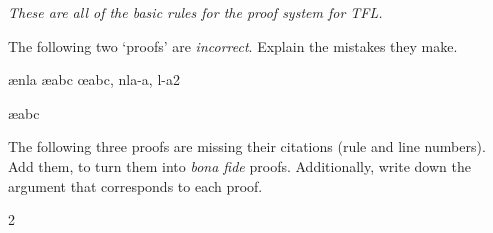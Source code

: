 \emph{These are all of the basic rules for the proof system for TFL.}

\practiceproblems

\problempart
The following two `proofs' are \emph{incorrect}. Explain the mistakes they make.
\begin{fitchproof}
\PR
\open
{}\AS
{}\ae{nla}
	\ae{abc}
\close
\open
	\AS
\close
{}\oe{abc, nla-a, l-a2}
\end{fitchproof}

\begin{fitchproof}
\PR
{}\PR
{}\ae{abc}
\end{fitchproof}

\problempart
The following three proofs are missing their citations (rule and line numbers). Add them, to turn them into \emph{bona fide} proofs. Additionally, write down the argument that corresponds to each proof.
\begin{multicols}{2}
\begin{fitchproof}
\end{fitchproof}

\begin{fitchproof}
\open
\close
{}%
\end{fitchproof}

\begin{fitchproof}
\open
\close
\open
\close
{}%
\end{fitchproof}
\end{multicols}

